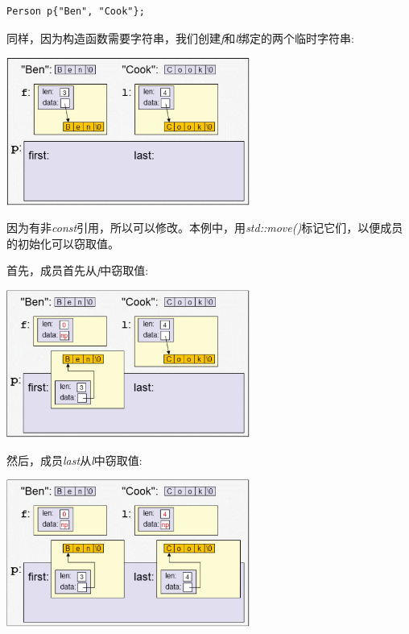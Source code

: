 \begin{lstlisting}[caption={}]
Person p{"Ben", "Cook"};
\end{lstlisting}

同样，因为构造函数需要字符串，我们创建\textit{f}和\textit{l}绑定的两个临时字符串:\par

\begin{center}
	\includegraphics[width=0.6\textwidth]{content/1/chapter4/images/8}
\end{center}

因为有非\textit{const}引用，所以可以修改。本例中，用\textit{std::move()}标记它们，以便成员的初始化可以窃取值。\par

首先，成员首先从\textit{f}中窃取值:\par

\begin{center}
	\includegraphics[width=0.6\textwidth]{content/1/chapter4/images/9}
\end{center}

然后，成员\textit{last}从\textit{l}中窃取值:\par

\begin{center}
	\includegraphics[width=0.6\textwidth]{content/1/chapter4/images/10}
\end{center}

